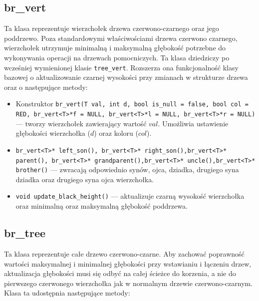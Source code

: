 \documentclass[declaration,shortabstract]{iithesis}
\theoremstyle{thm}
\theoremstyle{remark}
\theoremstyle{plain}
\theoremstyle{plain}
\theoremstyle{plain}
\begin{document}
\subsection{br\_vert}

Ta klasa reprezentuje wierzchołek drzewa czerwono-czarnego oraz jego poddrzewo. 
Poza standardowymi właściwościami drzewa czerwono czarnego, wierzchołek utrzymuje minimalną i maksymalną głębokość potrzebne do wykonywania operacji na drzewach pomocniczych. 
Ta klasa dziedziczy po wcześniej wymienionej klasie \texttt{tree\_vert}. 
Rozszerza ona funkcjonalność klasy bazowej o aktualizowanie czarnej wysokości przy zmianach w strukturze drzewa oraz o następujące metody:

\begin{itemize}

\item{Konstruktor \texttt{br\_vert(T val, int d, bool is\_null = false, bool col = RED, br\_vert<T>*f = NULL, br\_vert<T>*l = NULL, br\_vert<T>*r = NULL)} --- tworzy wierzchołek zawierający wartość $val$. Umożliwia ustawienie głębokości wierzchołka ($d$) oraz koloru ($col$).}

\item{\texttt{br\_vert<T>* left\_son(), br\_vert<T>* right\_son(),br\_vert<T>* parent(), br\_vert<T>* grandparent(),br\_vert<T>* uncle(),br\_vert<T>* brother()} --- zwracają odpowiednio synów, ojca, dziadka, drugiego syna dziadka oraz drugiego syna ojca wierzchołka. }
    
\item{\texttt{void update\_black\_height()} --- aktualizuje czarną wysokość wierzchołka oraz minimalną oraz maksymalną głębokość poddrzewa.}

\end{itemize}

\subsection{br\_tree}

Ta klasa reprezentuje całe drzewo czerwono-czarne. Aby zachować poprawność wartości maksymalnej i minimalnej głębokości przy wstawianiu i łączeniu drzew, aktualizacja głębokości musi się odbyć na całej ścieżce do korzenia, a nie do pierwszego czerwonego wierzchołka jak w normalnym drzewie czerwono-czarnym. Klasa ta udostępnia następujące metody: 
\end{document}
